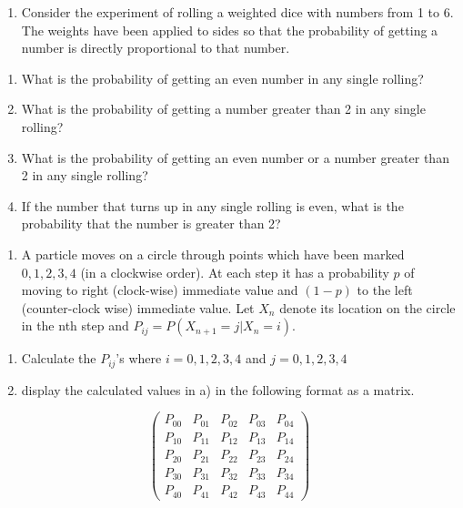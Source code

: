 \documentclass[]{book}
\providecommand{\tightlist}{%
  \setlength{\itemsep}{0pt}\setlength{\parskip}{0pt}}
\begin{document}
\begin{enumerate}
\def\labelenumi{\arabic{enumi}.}
\setcounter{enumi}{20}
\tightlist
\item
  Consider the experiment of rolling a weighted dice with numbers from 1 to 6. The weights have been applied to sides so that the probability of getting a number is directly proportional to that number.
\end{enumerate}

\begin{enumerate}
\def\labelenumi{(\alph{enumi})}
\tightlist
\item
  What is the probability of getting an even number in any single rolling?
\item
  What is the probability of getting a number greater than 2 in any single rolling?
\item
  What is the probability of getting an even number or a number greater than 2 in any single rolling?
\item
  If the number that turns up in any single rolling is even, what is the probability that the number is greater than 2?
\end{enumerate}

\begin{enumerate}
\def\labelenumi{\arabic{enumi}.}
\setcounter{enumi}{21}
\tightlist
\item
  A particle moves on a circle through points which have been marked \(0, 1, 2, 3, 4\) (in a clockwise order). At each step it has a probability \(p\) of moving to right (clock-wise) immediate value and \((1-p)\) to the left (counter-clock wise) immediate value. Let \(X_n\) denote its location on the circle in the nth step and \(P_{ij}= P(X_{n+1} =j |X_{n}=i)\).
\end{enumerate}

\begin{enumerate}
\def\labelenumi{\alph{enumi})}
\tightlist
\item
  Calculate the \(P_{ij}\)'s where \(i=0,1,2,3,4\) and \(j= 0,1,2,3,4\)
\item
  display the calculated values in a) in the following format as a matrix.
\end{enumerate}

\[\begin{pmatrix}
P_{00} & P_{01} & P_{02}& P_{03} & P_{04}\\ 
 P_{10} & P_{11} & P_{12}& P_{13} & P_{14}\\
 P_{20} & P_{21} & P_{22}& P_{23} & P_{24}\\
 P_{30} & P_{31} & P_{32}& P_{33} & P_{34}\\
 P_{40} & P_{41} & P_{42}& P_{43} & P_{44}
\end{pmatrix}\]
\end{document}
